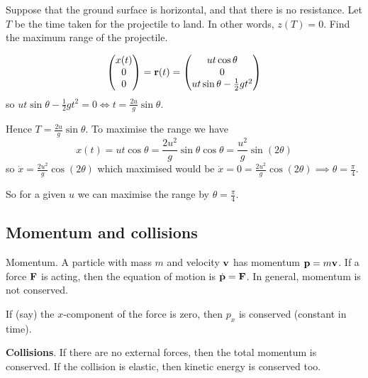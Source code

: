 \documentclass[10pt, a4paper]{article}
\begin{document}
\begin{example}
    Suppose that the ground surface is horizontal,
    and that there is no resistance.
    Let $T$ be the time taken for the projectile to land.
    In other words,
    $z(T) = 0$.
    Find the maximum range of the projectile.

    \begin{solution}
        \[
        \begin{pmatrix}
            x(t) \\ 0 \\ 0
        \end{pmatrix} = \mathbf{r}(t) = \begin{pmatrix}
            ut\cos{\theta} \\
            0 \\
            ut\sin{\theta} - \frac{1}{2}gt ^ 2
        \end{pmatrix}
        \]
        so $ut\sin{\theta} - \frac{1}{2}gt ^ 2 = 0 \iff t = \frac{2u}{g}\sin{\theta}$.

        Hence $T = \frac{2u}{g}\sin{\theta}$.
        To maximise the range we have
        \[
        x(t) = ut\cos{\theta} = \frac{2u ^ 2}{g}\sin{\theta}\cos{\theta} = \frac{u ^ 2}{g}\sin(2\theta)
        \]
        so $\dot{x} = \frac{2u ^ 2}{g}\cos(2\theta)$ which maximised would be $\dot{x} = 0 = \frac{2u ^ 2}{g}\cos(2\theta) \implies \theta = \frac{\pi}{4}$.

        So for a given $u$ we can maximise the range by $\theta = \frac{\pi}{4}$.
    \end{solution}
\end{example}


\subsection{Momentum and collisions}

\begin{definition}
    Momentum.
    A particle with mass $m$ and velocity $\mathbf{v}$ has momentum $\mathbf{p} = m\mathbf{v}$.
    If a force $\mathbf{F}$ is acting,
    then the equation of motion is $\dot{\mathbf{p}} = \mathbf{F}$.
    In general,
    momentum is not conserved.

    If
    (say)
    the $x$-component of the force is zero,
    then $p_x$ is conserved
    (constant in time).
\end{definition}

\textbf{Collisions}.
If there are no external forces,
then the total momentum is conserved.
If the collision is elastic,
then kinetic energy is conserved too.
\end{document}
